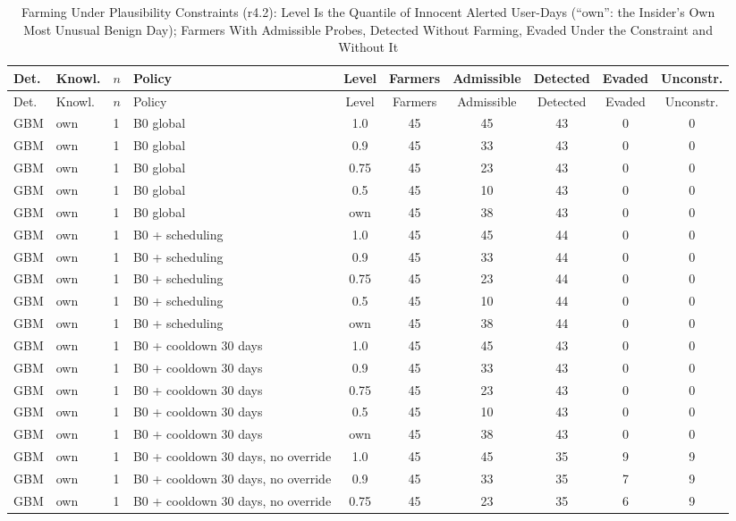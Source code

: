 \documentclass[10pt,onecolumn,letterpaper]{article}
\begin{document}
\begin{longtable}{lllp{4.4cm}cccccc}
\caption{Farming Under Plausibility Constraints (r4.2): Level Is the Quantile of Innocent Alerted User-Days (``own'': the Insider's Own Most Unusual Benign Day); Farmers With Admissible Probes, Detected Without Farming, Evaded Under the Constraint and Without It\label{tab:e-m2-r42}}\\
\toprule
Det. & Knowl. & $n$ & Policy & Level & Farmers & Admissible & Detected & Evaded & Unconstr. \\
\midrule
\endfirsthead
\toprule
Det. & Knowl. & $n$ & Policy & Level & Farmers & Admissible & Detected & Evaded & Unconstr. \\
\midrule
\endhead
GBM & own & 1 & B0 global & 1.0 & 45 & 45 & 43 & 0 & 0 \\
GBM & own & 1 & B0 global & 0.9 & 45 & 33 & 43 & 0 & 0 \\
GBM & own & 1 & B0 global & 0.75 & 45 & 23 & 43 & 0 & 0 \\
GBM & own & 1 & B0 global & 0.5 & 45 & 10 & 43 & 0 & 0 \\
GBM & own & 1 & B0 global & own & 45 & 38 & 43 & 0 & 0 \\
GBM & own & 1 & B0 + scheduling & 1.0 & 45 & 45 & 44 & 0 & 0 \\
GBM & own & 1 & B0 + scheduling & 0.9 & 45 & 33 & 44 & 0 & 0 \\
GBM & own & 1 & B0 + scheduling & 0.75 & 45 & 23 & 44 & 0 & 0 \\
GBM & own & 1 & B0 + scheduling & 0.5 & 45 & 10 & 44 & 0 & 0 \\
GBM & own & 1 & B0 + scheduling & own & 45 & 38 & 44 & 0 & 0 \\
GBM & own & 1 & B0 + cooldown 30 days & 1.0 & 45 & 45 & 43 & 0 & 0 \\
GBM & own & 1 & B0 + cooldown 30 days & 0.9 & 45 & 33 & 43 & 0 & 0 \\
GBM & own & 1 & B0 + cooldown 30 days & 0.75 & 45 & 23 & 43 & 0 & 0 \\
GBM & own & 1 & B0 + cooldown 30 days & 0.5 & 45 & 10 & 43 & 0 & 0 \\
GBM & own & 1 & B0 + cooldown 30 days & own & 45 & 38 & 43 & 0 & 0 \\
GBM & own & 1 & B0 + cooldown 30 days, no override & 1.0 & 45 & 45 & 35 & 9 & 9 \\
GBM & own & 1 & B0 + cooldown 30 days, no override & 0.9 & 45 & 33 & 35 & 7 & 9 \\
GBM & own & 1 & B0 + cooldown 30 days, no override & 0.75 & 45 & 23 & 35 & 6 & 9 \\

\end{longtable}
\end{document}

